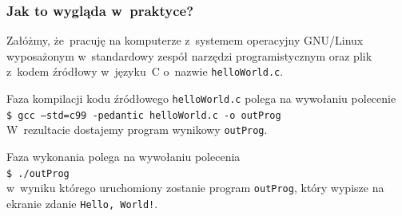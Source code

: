\documentclass[10pt,t]{beamer}
\begin{document}
\begin{frame}
  \frametitle{Jak to wygląda w~praktyce?}


  Załóżmy, że~pracuję na komputerze z~systemem operacyjny GNU/Linux
  wyposażonym w~standardowy zespół narzędzi programistycznym oraz plik
  z~kodem źródłowy w~języku~C o~nazwie \texttt{helloWorld.c}.

  Faza kompilacji kodu źródłowego \texttt{helloWorld.c} polega na
  wywołaniu polecenie \\
  \texttt{\$ gcc --std=c99 -pedantic helloWorld.c -o outProg} \\
  W~rezultacie dostajemy program wynikowy \texttt{outProg}.

  Faza wykonania polega na wywołaniu polecenia \\
  \texttt{\$ ./outProg} \\
  w~wyniku którego uruchomiony zostanie program \texttt{outProg}, który
  wypisze na ekranie zdanie \texttt{Hello, World!}.

\end{frame}
\end{document}
